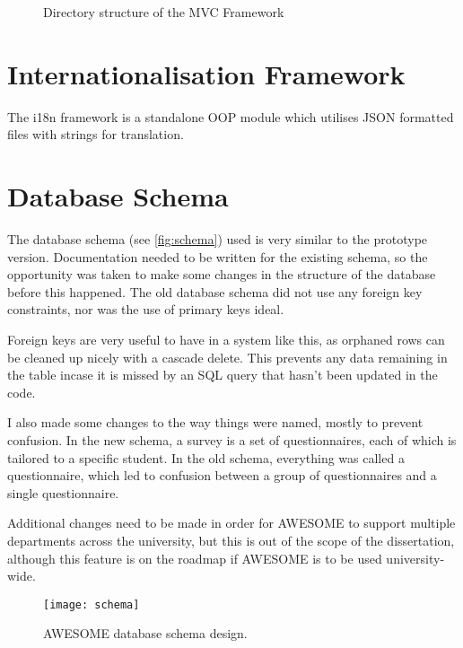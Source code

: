 	\begin{figure}[H]
		\caption{Directory structure of the \acs{MVC} Framework}
		\label{fig:mvcdirtree}
	\end{figure}	
	
	\section{Internationalisation Framework}
	\label{sec:i18nframework}
	
	The \ac{i18n} framework is a standalone \ac{OOP} module which utilises JSON formatted files with strings for translation.
	
	\section{Database Schema}
	
	The database schema (see \autoref{fig:schema}) used is very similar to the prototype version.
	Documentation needed to be written for the existing schema, so the opportunity was taken to make some changes in the structure of the database before this happened.
	The old database schema did not use any foreign key constraints, nor was the use of primary keys ideal.
	
	Foreign keys are very useful to have in a system like this, as orphaned rows can be cleaned up nicely with a cascade delete.
	This prevents any data remaining in the table incase it is missed by an \ac{SQL} query that hasn't been updated in the code.
	
	I also made some changes to the way things were named, mostly to prevent confusion.
	In the new schema, a survey is a set of questionnaires, each of which is tailored to a specific student.
	In the old schema, everything was called a questionnaire, which led to confusion between a group of questionnaires and a single questionnaire.

	Additional changes need to be made in order for \ac{AWESOME} to support multiple departments across the university, but this is out of the scope of the dissertation, although this feature is on the roadmap if \ac{AWESOME} is to be used university-wide.
	
	\begin{figure}[H]
		\hspace{-0.165\textwidth}
		\texttt{[image: schema]}
		\caption{\ac{AWESOME} database schema design.}
		\label{fig:schema}
	\end{figure}
	
